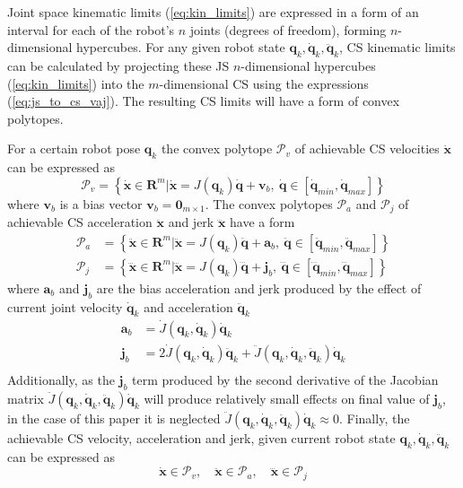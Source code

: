 Joint space kinematic limits (\ref{eq:kin_limits}) are expressed in a form of an interval for each of the robot's $n$ joints (degrees of freedom), forming $n$-dimensional hypercubes. For any given robot state $\bm{q}_k,\dot{\bm{q}}_k,\ddot{\bm{q}}_k$, CS kinematic limits can be calculated by projecting these JS $n$-dimensional hypercubes (\ref{eq:kin_limits}) into the $m$-dimensional CS using the expressions (\ref{eq:js_to_cs_vaj}). The resulting CS limits will have a form of convex polytopes. 

For a certain robot pose $\bm{q}_k$ the convex polytope $\mathcal{P}_v$ of achievable CS velocities $\dot{\bm{x}}$ can be expressed as
\begin{equation}
    \mathcal{P}_v = \left\{ \dot{\bm{x}}\in\mathbf{R}^m | \dot{\bm{x}}=J(\bm{q}_k)\dot{\bm{q}}\! +\! \bm{v}_b, ~ \dot{\bm{q}}\in \left[\dot{\bm{q}}_{min}, \dot{\bm{q}}_{max} \right] \right\}
    \label{eq:vel_poly}
\end{equation}
where $\bm{v}_b$ is a bias vector $\bm{v}_b\!=\!\bm{0}_{m\times 1}$. The convex polytopes $\mathcal{P}_a$ and $\mathcal{P}_j$ of achievable CS acceleration $\ddot{\bm{x}}$ and jerk $\dddot{\bm{x}}$ have a form
\begin{equation}
\begin{split}
    \mathcal{P}_a \!&=\! \left\{ \ddot{\bm{x}}\in\mathbf{R}^m | \ddot{\bm{x}}=J(\bm{q}_k)\ddot{\bm{q}}\! +\! \bm{a}_b, ~ \ddot{\bm{q}}\in \left[\ddot{\bm{q}}_{min}, \ddot{\bm{q}}_{max} \right] \right\}\\
    \mathcal{P}_j\!&=\! \left\{ \dddot{\bm{x}}\!\in\mathbf{R}^m | \dddot{\bm{x}}\!=\!J(\bm{q}_k)\dddot{\bm{q}}\! \!+\!\bm{j}_b, ~ \!\dddot{\bm{q\!}}\!\in \left[\!\dddot{\bm{q\!}}_{min}, \dddot{\bm{q\!}}_{max} \right] \right\}
\end{split}\label{eq:jerk_acc_poly}
\end{equation}
where $\bm{a}_b$ and $\bm{j}_b$ are the bias acceleration and jerk produced by the effect of current joint velocity $\dot{\bm{q}}_k$ and acceleration $\ddot{\bm{q}}_k$ 
\begin{equation}
\begin{split}
\bm{a}_b&= \dot{J}(\bm{q}_k,\dot{\bm{q}}_k)\dot{\bm{q}}_k\\
\bm{j}_b&= 2\dot{J}(\bm{q}_k,\dot{\bm{q}}_k)\ddot{\bm{q}}_k + \ddot{J}(\bm{q}_k,\dot{\bm{q}}_k,\ddot{\bm{q}}_k)\dot{\bm{q}}_k\\
 \end{split} \label{eq:bias_terms}
\end{equation}
Additionally, as the $\bm{j}_b$ term produced by the second derivative of the Jacobian matrix $\ddot{J}(\bm{q}_k,\dot{\bm{q}}_k,\ddot{\bm{q}}_k)\dot{\bm{q}}_k$ will produce relatively small effects on final value of $\bm{j}_b$, in the case of this paper it is neglected $\ddot{J}(\bm{q}_k,\dot{\bm{q}}_k,\ddot{\bm{q}}_k)\dot{\bm{q}}_k \approx 0$. Finally, the achievable CS velocity, acceleration and jerk, given current robot state $\bm{q}_k,\dot{\bm{q}}_k,\ddot{\bm{q}}_k$ can be expressed as
\begin{equation}
    \dot{\bm{x}}\in \mathcal{P}_v, \quad \ddot{\bm{x}}\in \mathcal{P}_a, \quad \dddot{\bm{x}}\in \mathcal{P}_j\label{eq:limits_poly}
\end{equation}

